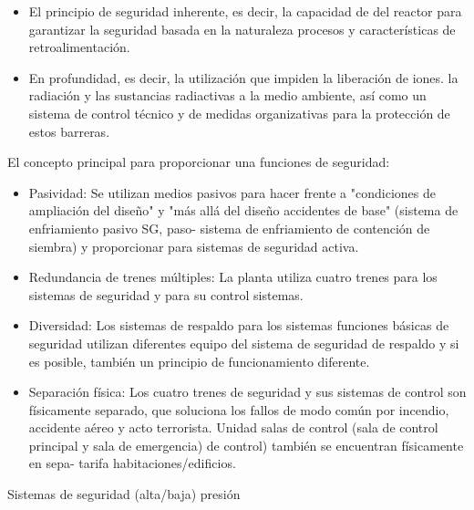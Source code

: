 \documentclass[]{article}
\begin{document}
\begin{itemize}
	\item El principio de seguridad inherente, es decir, la capacidad de
	del reactor para garantizar la seguridad basada en la naturaleza
	procesos y características de retroalimentación.
	\item En profundidad, es decir, la utilización que impiden la liberación de iones.
	la radiación y las sustancias radiactivas a la
	medio ambiente, así como un sistema de control técnico y de
	medidas organizativas para la protección de estos
	barreras.
\end{itemize}
El concepto principal para proporcionar una
funciones de seguridad:\\
\begin{itemize}
\item  Pasividad: Se utilizan medios pasivos para hacer frente a
"condiciones de ampliación del diseño" y "más allá del diseño
accidentes de base" (sistema de enfriamiento pasivo SG, paso-
sistema de enfriamiento de contención de siembra) y proporcionar
para sistemas de seguridad activa.
\item  Redundancia de trenes múltiples: La planta utiliza
cuatro trenes para los sistemas de seguridad y para su control
sistemas.
	\item Diversidad: Los sistemas de respaldo para los sistemas
	funciones básicas de seguridad utilizan diferentes
	equipo del sistema de seguridad de respaldo y
	si es posible, también un principio de funcionamiento diferente.
	\item Separación física: Los cuatro trenes de seguridad
	y sus sistemas de control son físicamente
	separado, que soluciona los fallos de modo común
	por incendio, accidente aéreo y acto terrorista. Unidad
	salas de control (sala de control principal y sala de emergencia)
	de control) también se encuentran físicamente en sepa-
	tarifa habitaciones/edificios.
\end{itemize}


Sistemas de seguridad (alta/baja) presión
\end{document}
